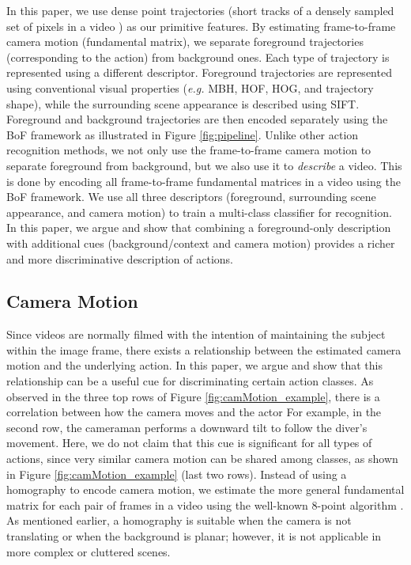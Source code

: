 \documentclass[runningheads]{llncs}
\begin{document}
In this paper, we use dense point trajectories (short tracks of a densely sampled set of pixels in a video \cite{wang2013}) as our primitive features. By estimating frame-to-frame camera motion (fundamental matrix), we separate foreground trajectories (corresponding to the action) from background ones. Each type of trajectory is represented using a different descriptor. Foreground trajectories are represented using conventional visual properties (\emph{e.g.} MBH, HOF, HOG, and trajectory shape), while the surrounding scene appearance is described using SIFT. Foreground and background trajectories are then encoded separately using the BoF framework as illustrated in Figure \ref{fig:pipeline}. Unlike other action recognition methods, we not only use the frame-to-frame camera motion to separate foreground from background, but we also use it to \emph{describe} a video. This is done by encoding all frame-to-frame fundamental matrices in a video using the BoF framework. We use all three descriptors (foreground, surrounding scene appearance, and camera motion) to train a multi-class classifier for recognition. In this paper, we argue and show that combining a foreground-only description \cite{wang2013} with additional cues (background/context and camera motion) provides a richer and more discriminative description of actions.


\subsection{Camera Motion}
\label{subsec:cam_motion}
Since videos are normally filmed with the intention of maintaining the subject within the image frame, there exists a relationship between the estimated camera motion and the underlying action. In this paper, we argue and show that this relationship can be a useful cue for discriminating certain action classes. As observed in the three top rows of Figure \ref{fig:camMotion_example}, there is a correlation between how the camera moves and the actor For example, in the second row, the cameraman performs a downward tilt to follow the diver's movement. Here, we do not claim that this cue is significant for all types of actions, since very similar camera motion can be shared among classes, as shown in Figure \ref{fig:camMotion_example} (last two rows). Instead of using a homography to encode camera motion, we estimate the more general fundamental matrix for each pair of frames in a video using the well-known 8-point algorithm \cite{eightpoint97}. As mentioned earlier, a homography is suitable when the camera is not translating or when the background is planar; however, it is not applicable in more complex or cluttered scenes.
\end{document}
